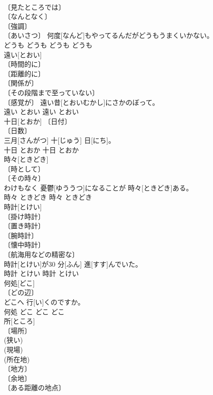 \documentclass[8pt]{extreport}
\begin{document}
\begin{CJK}{UTF8}{min}
\\	〔見たところでは〕 
\\	〔なんとなく〕 
\\	〔強調〕 
\\	〔あいさつ〕	何度[なんど]もやってるんだがどうもうまくいかない。	
\\	どうも	どうも	どうも	どうも	
\\	遠い[とおい]	
\\	〔時間的に〕 
\\	〔距離的に〕 
\\	〔関係が〕 
\\	〔その段階まで至っていない〕 
\\	〔感覚が〕	遠い昔[とおいむかし]にさかのぼって。	
\\	遠い	とおい	遠い	とおい	
\\	十日[とおか]	〔日付〕 
\\	〔日数〕 
\\	三月[さんがつ] 十[じゅう] 日[にち]。	
\\	十日	とおか	十日	とおか	
\\	時々[ときどき]	
\\	〔時として〕 
\\	〔その時々〕 
\\	わけもなく 憂鬱[ゆううつ]になることが 時々[ときどき]ある。	
\\	時々	ときどき	時々	ときどき	
\\	時計[とけい]	
\\	〔掛け時計〕 
\\	〔置き時計〕 
\\	〔腕時計〕 
\\	〔懐中時計〕 
\\	〔航海用などの精密な〕 
\\	時計[とけい]が30 分[ふん] 進[すす]んでいた。	
\\	時計	とけい	時計	とけい	
\\	何処[どこ]	
\\	〔どの辺〕 
\\	どこへ 行[い]くのですか。	
\\	何処	どこ	どこ	どこ	
\\	所[ところ]	
\\	〔場所〕 
\\	(狭い) 
\\	(現場) 
\\	(所在地) 
\\	〔地方〕 
\\	〔余地〕 
\\	〔ある距離の地点〕 

\end{CJK}
\end{document}

